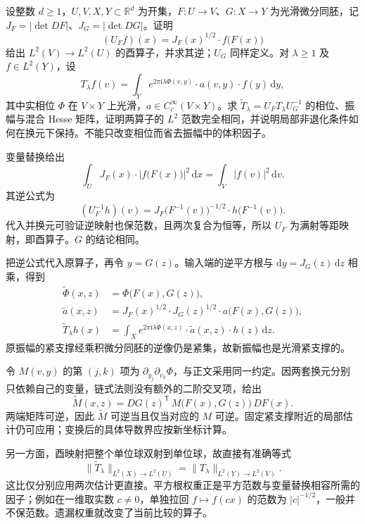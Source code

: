 \begin{exercise}\label{b2:ex:21-new-7}
设整数 \(d\geq1\)，\(U,V,X,Y\subset\mathbb R^d\) 为开集，\(F:U\to V\)、\(G:X\to Y\) 为光滑微分同胚，记
\(J_F=|\det DF|\)、\(J_G=|\det DG|\)。证明
\[
 (U_Ff)(x)=J_F(x)^{1/2}\cdot f\bigl(F(x)\bigr)
\]
给出 \(L^2(V)\to L^2(U)\) 的酉算子，并求其逆；\(U_G\) 同样定义。对 \(\lambda\geq1\) 及 \(f\in L^2(Y)\)，设
\[
 T_\lambda f(v)=\int_Y e^{2\pi\mathrm i\lambda\Phi(v,y)}
                                  \cdot a(v,y)\cdot f(y)\,\mathrm dy,
\]
其中实相位 \(\Phi\) 在 \(V\times Y\) 上光滑，\(a\in C_c^\infty(V\times Y)\)。求
\(\widetilde T_\lambda=U_FT_\lambda U_G^{-1}\) 的相位、振幅与混合 Hesse 矩阵，证明两算子的 \(L^2\) 范数完全相同，并说明局部非退化条件如何在换元下保持。不能只改变相位而省去振幅中的体积因子。
\end{exercise}
\begin{solution}
变量替换给出
\[
 \int_U J_F(x)\cdot|f\bigl(F(x)\bigr)|^2\,\mathrm dx
       =\int_V|f(v)|^2\,\mathrm dv.
\]
其逆公式为
\[
 (U_F^{-1}h)(v)
 =J_F\bigl(F^{-1}(v)\bigr)^{-1/2}\cdot h\bigl(F^{-1}(v)\bigr).
\]
代入并换元可验证逆映射也保范数，且两次复合为恒等，所以 \(U_F\) 为满射等距映射，即酉算子。\(G\) 的结论相同。

把逆公式代入原算子，再令 \(y=G(z)\)。输入端的逆平方根与 \(\mathrm dy=J_G(z)\,\mathrm dz\) 相乘，得到
\[
 \begin{aligned}
 \widetilde\Phi(x,z)&=\Phi\bigl(F(x),G(z)\bigr),\\
 \widetilde a(x,z)&=J_F(x)^{1/2}\cdot J_G(z)^{1/2}
                                \cdot a\bigl(F(x),G(z)\bigr),\\
 \widetilde T_\lambda h(x)
 &=\int_Xe^{2\pi\mathrm i\lambda\widetilde\Phi(x,z)}
                            \cdot\widetilde a(x,z)\cdot h(z)\,\mathrm dz.
 \end{aligned}
\]
原振幅的紧支撑经乘积微分同胚的逆像仍是紧集，故新振幅也是光滑紧支撑的。

令 \(M(v,y)\) 的第 \((j,k)\) 项为 \(\partial_{y_j}\partial_{v_k}\Phi\)，与正文采用同一约定。因两套换元分别只依赖自己的变量，链式法则没有额外的二阶交叉项，给出
\[
 \widetilde M(x,z)
 =DG(z)^{\mathsf T}\,M\bigl(F(x),G(z)\bigr)\,DF(x).
\]
两端矩阵可逆，因此 \(\widetilde M\) 可逆当且仅当对应的 \(M\) 可逆。固定紧支撑附近的局部估计仍可应用；变换后的具体导数界应按新坐标计算。

另一方面，酉映射把整个单位球双射到单位球，故直接有准确等式
\[
 \|\widetilde T_\lambda\|_{L^2(X)\to L^2(U)}
       =\|T_\lambda\|_{L^2(Y)\to L^2(V)}.
\]
这比仅分别应用两次估计更直接。平方根权重正是平方范数与变量替换相容所需的因子；例如在一维取实数 \(c\ne0\)，单独拉回 \(f\mapsto f(cx)\) 的范数为 \(|c|^{-1/2}\)，一般并不保范数。遗漏权重就改变了当前比较的算子。
\end{solution}

